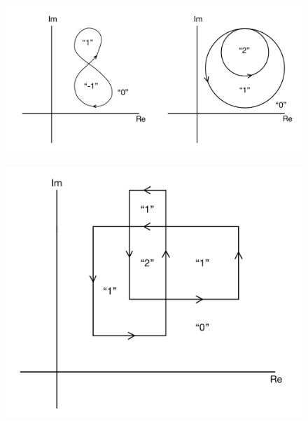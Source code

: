 \documentclass[11pt]{article}
\begin{document}
\begin{figure}[H]
\includegraphics[scale=0.2]{22_2}
\centering
\end{figure} 
\begin{figure}[H]
\includegraphics[scale=0.17]{22_3} 
\centering
\end{figure}
\fi
\end{document}
